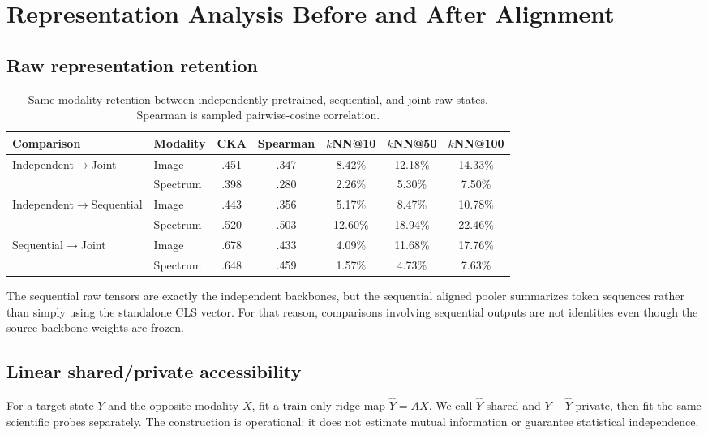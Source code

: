 \documentclass{article}
\begin{document}
\FloatBarrier
\section{Representation Analysis Before and After Alignment}
\label{app:representation}

\subsection{Raw representation retention}

\begin{table}[h]
\centering
\caption{Same-modality retention between independently pretrained, sequential,
and joint raw states. Spearman is sampled pairwise-cosine correlation.}
\label{tab:retention}
\scriptsize
\setlength{\tabcolsep}{3.5pt}
\begin{tabular}{llccccc}
\toprule
Comparison & Modality & CKA & Spearman & $k$NN@10 & $k$NN@50 & $k$NN@100\\
\midrule
Independent$\rightarrow$Joint & Image & .451 & .347 & 8.42\% & 12.18\% & 14.33\%\\
& Spectrum & .398 & .280 & 2.26\% & 5.30\% & 7.50\%\\
Independent$\rightarrow$Sequential & Image & .443 & .356 & 5.17\% & 8.47\% & 10.78\%\\
& Spectrum & .520 & .503 & 12.60\% & 18.94\% & 22.46\%\\
Sequential$\rightarrow$Joint & Image & .678 & .433 & 4.09\% & 11.68\% & 17.76\%\\
& Spectrum & .648 & .459 & 1.57\% & 4.73\% & 7.63\%\\
\bottomrule
\end{tabular}
\end{table}

The sequential raw tensors are exactly the independent backbones, but the
sequential aligned pooler summarizes token sequences rather than simply using
the standalone CLS vector.
For that reason, comparisons involving sequential outputs are not identities
even though the source backbone weights are frozen.

\subsection{Linear shared/private accessibility}

For a target state $Y$ and the opposite modality $X$, fit a train-only ridge
map $\widehat Y=A X$.
We call $\widehat Y$ shared and $Y-\widehat Y$ private, then fit the same
scientific probes separately.
The construction is operational: it does not estimate mutual information or
guarantee statistical independence.
\end{document}
